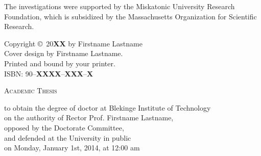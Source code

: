 {	\vfill

	The investigations were supported by the Miskatonic University Research Foundation, which is subsidized by the Massachusetts Organization for Scientific Research.

	\par\vspace {2cm}


	Copyright \copyright\ 20\textbf{XX} by Firstname Lastname\\[2ex]
	Cover design by Firstname Lastname.\\ %
	Printed and bound by your printer.\\[2ex] %
	ISBN: 90--\textbf{XXXX}--\textbf{XXX}--\textbf{X} %

	\clearpage
	\par\vskip 2cm

	\begin{center}
		\printtitle

		\par\vspace {6cm}
		\begin{large}
			\textsc{Academic Thesis}
		\end{large}
		
		\par\vspace {1cm}

		\begin{large}
			to obtain the degree of doctor at Blekinge Institute of Technology\\
			on the authority of Rector Prof. Firstname Lastname,\\
			opposed by the Doctorate Committee,\\
			and defended at the University in public\\
			on Monday, January 1st, 2014, at 12:00 am
		\end{large}


\end{center}}
